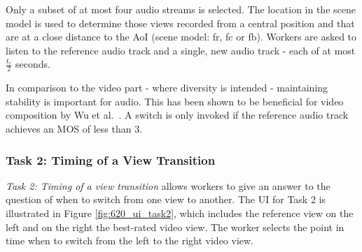 Only a subset of at most four audio streams is selected. 
The location in the scene model is used to determine those views recorded from a central position and that are at a close distance to the \ac{AoI} (scene model: fr, fc or fb).  
Workers are asked to listen to the reference audio track and a single, new audio track - each of at most $\frac{t_{r}}{2}$ seconds.

In comparison to the video part - where diversity is intended - maintaining stability is important for audio.
This has been shown to be beneficial for video composition by Wu et al.~\cite{Wu2015}.
A switch is only invoked if the reference audio track achieves an \ac{MOS} of less than 3.
\subsubsection{Task 2: Timing of a View Transition}
\emph{Task 2: Timing of a view transition} allows workers to give an answer to the question of when to switch from one view to another. 
The \ac{UI} for Task 2 is illustrated in Figure \ref{fig:620_ui_task2}, which includes the reference view on the left and on the right the best-rated video view.
The worker selects the point in time when to switch from the left to the right video view.
